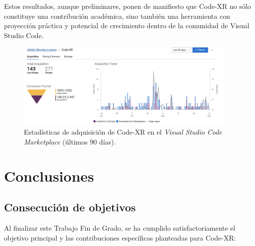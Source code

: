 \documentclass[a4paper, 12pt]{book}
\begin{document}
Estos resultados, aunque preliminares, ponen de manifiesto que Code-XR no sólo constituye una contribución académica, sino también una herramienta con proyección práctica y potencial de crecimiento dentro de la comunidad de Visual Studio Code.

\begin{figure}[H]
\centering
\includegraphics[width=0.95\textwidth]{img/marketplace-stats.png}
\caption{Estadísticas de adquisición de Code-XR en el \textit{Visual Studio Code Marketplace} (últimos 90 días).}
\label{fig:marketplace-stats}
\end{figure}


\cleardoublepage
\chapter{Conclusiones}
\label{chap:conclusiones}


\section{Consecución de objetivos}
\label{sec:consecucion-objetivos}

Al finalizar este Trabajo Fin de Grado, se ha cumplido satisfactoriamente el objetivo principal y las contribuciones específicas planteadas para Code-XR:
\end{document}
